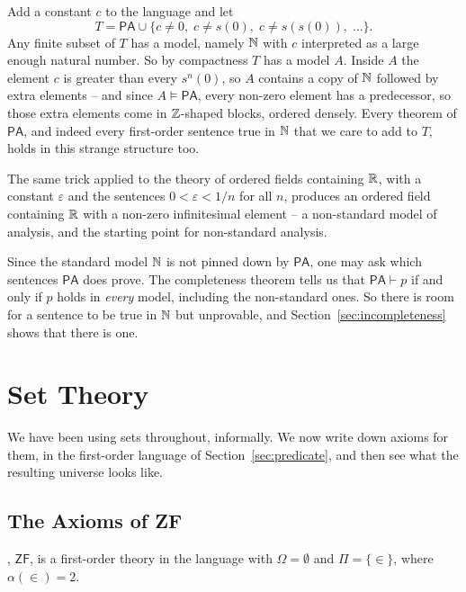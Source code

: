 \documentclass[a4paper]{scrartcl}
\newcommand{\PA}{\mathsf{PA}}
\newcommand{\ZF}{\mathsf{ZF}}
\begin{document}
\begin{example}
  Add a constant $c$ to the language and let
  $$T = \PA \cup \{c \neq 0, \; c \neq s(0), \; c \neq s(s(0)), \; \dots\}.$$
  Any finite subset of $T$ has a model, namely $\mathbb{N}$ with $c$ interpreted as a large enough natural number. So by compactness $T$ has a model $A$. Inside $A$ the element $c$ is greater than every $s^n(0)$, so $A$ contains a copy of $\mathbb{N}$ followed by extra elements -- and since $A \models \PA$, every non-zero element has a predecessor, so those extra elements come in $\mathbb{Z}$-shaped blocks, ordered densely. Every theorem of $\PA$, and indeed every first-order sentence true in $\mathbb{N}$ that we care to add to $T$, holds in this strange structure too.
\end{example}

The same trick applied to the theory of ordered fields containing $\mathbb{R}$, with a constant $\varepsilon$ and the sentences $0 < \varepsilon < 1/n$ for all $n$, produces an ordered field containing $\mathbb{R}$ with a non-zero infinitesimal element -- a non-standard model of analysis, and the starting point for non-standard analysis.

Since the standard model $\mathbb{N}$ is not pinned down by $\PA$, one may ask which sentences $\PA$ does prove. The completeness theorem tells us that $\PA \vdash p$ if and only if $p$ holds in \emph{every} model, including the non-standard ones. So there is room for a sentence to be true in $\mathbb{N}$ but unprovable, and Section~\ref{sec:incompleteness} shows that there is one.

\section{Set Theory}\label{sec:settheory}

We have been using sets throughout, informally. We now write down axioms for them, in the first-order language of Section~\ref{sec:predicate}, and then see what the resulting universe looks like.

\subsection{The Axioms of ZF}

\begin{definition}
  , $\ZF$, is a first-order theory in the language with $\Omega = \emptyset$ and $\Pi = \{\in\}$, where $\alpha(\in) = 2$.
\end{definition}
\end{document}
